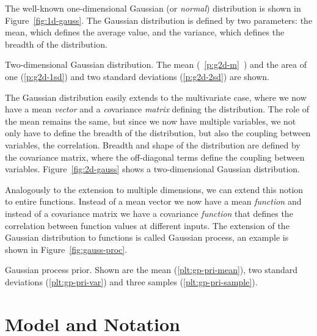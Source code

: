 The well-known one-dimensional Gaussian (or \emph{normal}) distribution is shown
in Figure~\ref{fig:1d-gauss}. The Gaussian distribution is defined by two
parameters: the mean, which defines the average value, and the variance, which
defines the breadth of the distribution.

\begin{marginfigure}
\setlength\figurewidth{\columnwidth}%
\setlength\figureheight{\figurewidth}%
  \caption[Two-dimensional Gaussian distribution.]{Two-dimensional Gaussian
distribution. The mean (~\ref*{p:g2d-m}~) and the area of one (\ref*{p:g2d-1sd})
and two standard deviations (\ref*{p:g2d-2sd}) are shown.}
  \label{fig:2d-gauss}
\end{marginfigure}

The Gaussian distribution easily extends to the multivariate case, where we now
have a mean \emph{vector} and a \emph{co}variance \emph{matrix} defining the
distribution. The role of the mean remains the same, but since we now have
multiple variables, we not only have to define the breadth of the distribution,
but also the coupling between variables, the correlation. Breadth and shape of
the distribution are defined by the covariance matrix, where the off-diagonal
terms define the coupling between variables. Figure~\ref{fig:2d-gauss} shows a
two-dimensional Gaussian distribution.

Analogously to the extension to multiple dimensions, we can extend this notion
to entire functions. Instead of a mean vector we now have a mean
\emph{function} and instead of a covariance matrix we have a covariance
\emph{function} that defines the correlation between function values at
different inputs. The extension of the Gaussian distribution to functions is
called Gaussian process, an example is shown in Figure~\ref{fig:gauss-proc}.

\begin{marginfigure}
\setlength\figurewidth{\columnwidth}%
\setlength\figureheight{0.618\figurewidth}%
  \caption[Gaussian process prior.]{Gaussian process prior. Shown are the
mean (\ref*{plt:gp-pri-mean}), two standard deviations (\ref*{plt:gp-pri-var})
and three samples (\ref*{plt:gp-pri-sample}).}
  \label{fig:gauss-proc}
\end{marginfigure}

\section{Model and Notation}

